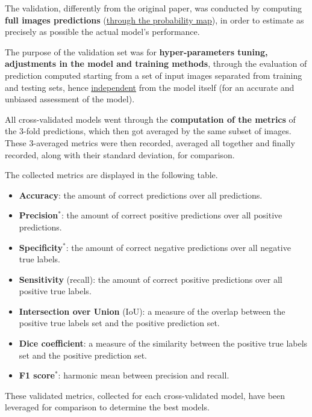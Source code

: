 \par The validation, differently from the original paper, was conducted by computing \textbf{full images predictions} (\uline{through the probability map}), in order to estimate as precisely as possible the actual model's performance.

\par
The purpose of the validation set was for \textbf{hyper-parameters tuning, adjustments in the model and training methods}, through the evaluation of prediction computed starting from a set of input images separated from training and testing sets, hence \uline{independent} from the model itself (for an accurate and unbiased assessment of the model).

\par
All cross-validated models went through the \textbf{computation of the metrics} of the 3-fold predictions, which then got averaged by the same subset of images. These 3-averaged metrics were then recorded, averaged all together and finally recorded, along with their standard deviation, for comparison.

The collected metrics are displayed in the following table.

\begin{itemize}
    \item \textbf{Accuracy}: the amount of correct predictions over all predictions.
    \item \textbf{Precision}$^*$: the amount of correct positive predictions over all positive predictions.
    \item \textbf{Specificity}$^*$: the amount of correct negative predictions over all negative true labels.
    \item \textbf{Sensitivity} (recall): the amount of correct positive predictions over all positive true labels.
    \item \textbf{Intersection over Union} (IoU): a measure of the overlap between the positive true labels set and the positive prediction set.
    \item \textbf{Dice coefficient}: a measure of the similarity between the positive true labels set and the positive prediction set.
    \item \textbf{F1 score}$^*$: harmonic mean between precision and recall.
\end{itemize}

 These validated metrics, collected for each cross-validated model, have been leveraged for comparison to determine the best models.

